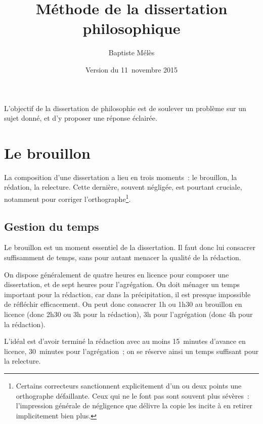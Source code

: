 \documentclass[a4paper,11pt]{article}
\author{Baptiste Mélès}
\title{Méthode de la dissertation philosophique}
\date{Version du 11~novembre 2015}
\begin{document}
\maketitle

L'objectif de la dissertation de philosophie est de soulever un problème
sur un sujet donné, et d'y proposer une réponse éclairée.


\tableofcontents

\par




\section{Le brouillon}

La composition d'une dissertation a lieu en trois moments~: le
brouillon, la rédation, la relecture. Cette dernière, souvent négligée,
est pourtant cruciale, notamment pour corriger
l'orthographe\footnote{Certains correcteurs sanctionnent explicitement
  d'un ou deux points une orthographe défaillante. Ceux qui ne le font
  pas sont souvent plus sévères~: l'impression générale de négligence
  que délivre la copie les incite à en retirer implicitement bien
  plus.}.

\par

\subsection{Gestion du temps}

Le brouillon est un moment essentiel de la dissertation. Il faut donc
lui consacrer suffisamment de temps, sans pour autant menacer la qualité
de la rédaction.

\par

On dispose généralement de quatre heures en licence pour composer une
dissertation, et de sept heures pour l'agrégation. On doit ménager un
temps important pour la rédaction, car dans la précipitation, il est
presque impossible de réfléchir efficacement. On peut donc consacrer 1h
ou 1h30 au brouillon en licence (donc 2h30 ou 3h pour la rédaction), 3h
pour l'agrégation (donc 4h pour la rédaction).

\par

L'idéal est d'avoir terminé la rédaction avec au moins 15~minutes
d'avance en licence, 30~minutes pour l'agrégation~; on se réserve ainsi
un temps suffisant pour la relecture.
\end{document}
